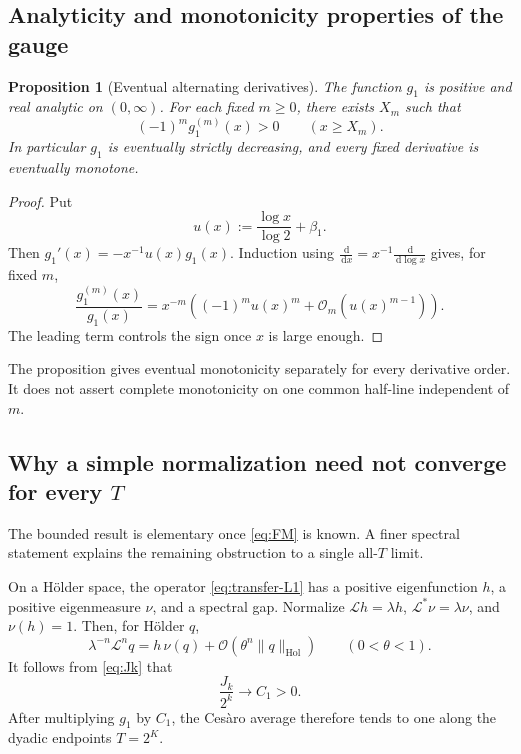 \documentclass[11pt,oneside]{article}
\newtheorem{proposition}[theorem]{Proposition}
\theoremstyle{definition}
\theoremstyle{remark}
\newcommand{\dd}{\,\mathrm d}
\newcommand{\Lop}{\mathcal L}
\newcommand{\bigO}{\mathcal O}
\begin{document}
\subsection{Analyticity and monotonicity properties of the gauge}

\begin{proposition}[Eventual alternating derivatives]\label{prop:g-derivatives}
The function $g_1$ is positive and real analytic on $(0,\infty)$.  For each fixed
$m\ge0$, there exists $X_m$ such that
\begin{equation}\label{eq:derivative-sign}
 (-1)^m g_1^{(m)}(x)>0\qquad(x\ge X_m).
\end{equation}
In particular $g_1$ is eventually strictly decreasing, and every fixed derivative is
eventually monotone.
\end{proposition}

\begin{proof}
Put
\[
 u(x):=\frac{\log x}{\log2}+\beta_1.
\]
Then $g_1'(x)=-x^{-1}u(x)g_1(x)$.  Induction using
$\frac{\dd}{\dd x}=x^{-1}\frac{\dd}{\dd\log x}$ gives, for fixed $m$,
\begin{equation}\label{eq:derivative-asymp}
 \frac{g_1^{(m)}(x)}{g_1(x)}
 =x^{-m}\left((-1)^m u(x)^m+\bigO_m(u(x)^{m-1})\right).
\end{equation}
The leading term controls the sign once $x$ is large enough.
\end{proof}

The proposition gives eventual monotonicity separately for every derivative order.  It
does not assert complete monotonicity on one common half-line independent of $m$.

\subsection{Why a simple normalization need not converge for every \texorpdfstring{$T$}{T}}

The bounded result is elementary once \eqref{eq:FM} is known.  A finer spectral
statement explains the remaining obstruction to a single all-$T$ limit.

On a H\"older space, the operator \eqref{eq:transfer-L1} has a positive eigenfunction
$h$, a positive eigenmeasure $\nu$, and a spectral gap.  Normalize
$\Lop h=\lambda h$, $\Lop^*\nu=\lambda\nu$, and $\nu(h)=1$.  Then, for H\"older $q$,
\begin{equation}\label{eq:spectral-gap}
 \lambda^{-n}\Lop^nq
 =h\,\nu(q)+\bigO(\theta^n\|q\|_{\mathrm{Hol}})
 \qquad(0<\theta<1).
\end{equation}
It follows from \eqref{eq:Jk} that
\begin{equation}\label{eq:Jk-limit}
 \frac{J_k}{2^k}\longrightarrow C_1>0.
\end{equation}
After multiplying $g_1$ by $C_1$, the Ces\`aro average therefore tends to one along the
dyadic endpoints $T=2^K$.
\end{document}
